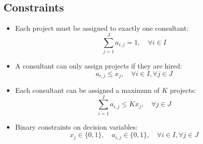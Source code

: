 \documentclass{article}
\begin{document}
\subsection*{Constraints}
\begin{itemize}
    \item Each project must be assigned to exactly one consultant:
    \[
    \sum_{j=1}^{J} a_{i,j} = 1, \quad \forall i \in I
    \]

    \item A consultant can only assign projects if they are hired:
    \[
    a_{i,j} \leq x_j, \quad \forall i \in I, \forall j \in J
    \]

    \item Each consultant can be assigned a maximum of \( K \) projects:
    \[
    \sum_{i=1}^{I} a_{i,j} \leq K x_j, \quad \forall j \in J
    \]

    \item Binary constraints on decision variables:
    \[
    x_j \in \{0, 1\}, \quad a_{i,j} \in \{0, 1\}, \quad \forall i \in I, \forall j \in J
    \]
\end{itemize}
\end{document}
